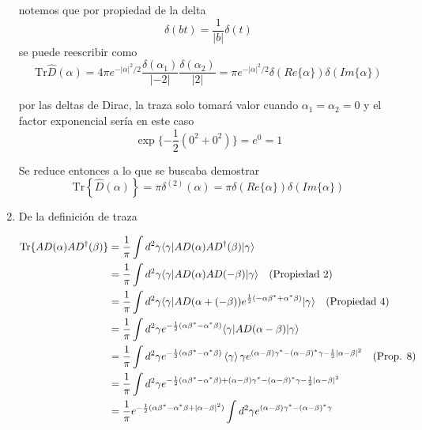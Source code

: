 \begin{enumerate}
notemos que por propiedad de la delta
\begin{equation*}
\delta(bt) = \frac{1}{|b|}\delta(t)
\end{equation*}
se puede reescribir como
\begin{equation*}
\mathrm{Tr}{\hat{D}(\alpha)} = 4\pi e^{-|\alpha|^2/2} \frac{\delta(\alpha_1)}{|-2|}\frac{\delta(\alpha_2)}{|2|} = \pi e^{-|\alpha|^2/2}\delta(Re\{\alpha\})\delta(Im\{\alpha\})
\end{equation*}

por las deltas de Dirac, la traza solo tomará valor cuando $\alpha_1 = \alpha_2 = 0$ y el factor exponencial sería en este caso
\begin{equation*}
\exp\{ -\frac{1}{2}(0^2 + 0^2) \} = e^0 = 1
\end{equation*}


Se reduce entonces a lo que se buscaba demostrar
\begin{equation*}
\mathrm{Tr}\left\{\hat{D}(\alpha)\right\} = \pi \delta^{(2)}(\alpha) = \pi\delta(Re\{\alpha\})\delta(Im\{\alpha\})
\end{equation*}
\item De la definición de traza


\begin{align}
\mathrm{Tr}\{ A{D}(\alpha)A{D}^{\dagger}(\beta) \} & = \frac{1}{\pi} \int d^2 \gamma \langle  \gamma \vert A{D}(\alpha) A{D}^{\dagger}(\beta) \vert \gamma \rangle \nonumber \\	
& = \frac{1}{\pi} \int d^2 \gamma \langle \gamma \vert A{D}(\alpha) A{D}(-\beta) \vert \gamma\rangle \quad (\text{Propiedad 2})\nonumber \\
& = \frac{1}{\pi} \int d^2 \gamma \langle \gamma \vert A{D}(\alpha + (-\beta))e^{\frac{1}{2}(-\alpha \beta^{*} + \alpha^{*} \beta)} \vert \gamma \rangle \quad (\text{Propiedad 4})\nonumber                                             \\
& = \frac{1}{\pi} \int d^2 \gamma e^{-\frac{1}{2}(\alpha \beta^* - \alpha^* \beta)} \langle \gamma \vert A{D}(\alpha-\beta)\vert \gamma\rangle  \nonumber                                                                          \\
& = \frac{1}{\pi} \int d^2 \gamma e^{-\frac{1}{2}(\alpha \beta^* - \alpha^* \beta)} \braket{\gamma}{\gamma} e^{(\alpha-\beta)\gamma^* - (\alpha-\beta)^* \gamma -\frac{1}{2}|\alpha-\beta|^2}\quad\text{(Prop. 8)}\nonumber \\
& = \frac{1}{\pi} \int d^2 \gamma e^{ -\frac{1}{2}(\alpha \beta^* - \alpha^* \beta) + (\alpha-\beta)\gamma^* - (\alpha-\beta)^* \gamma -\frac{1}{2}|\alpha-\beta|^2} \nonumber \\
& = \frac{1}{\pi} e^{-\frac{1}{2}(\alpha\beta^* - \alpha^*\beta + |\alpha-\beta|^2)} \int d^2 \gamma e^{ (\alpha-\beta)\gamma^* - (\alpha-\beta)^* \gamma } \label{eq:6-1}
\end{align}


\end{enumerate}
